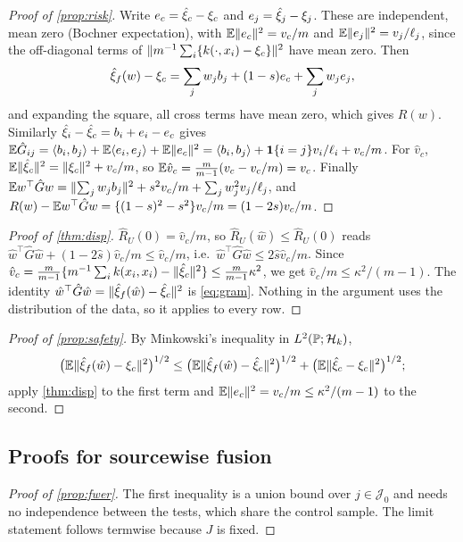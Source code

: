 \documentclass[11pt,a4paper]{article}
\begin{document}
\begin{proof}[Proof of \cref{prop:risk}]
Write $e_c=\hat\xi_c-\xi_c$ and $e_j=\hat\xi_j-\xi_j$. These are independent, mean zero (Bochner expectation), with $\mathbb{E}\lVert e_c\rVert^2=v_c/m$ and $\mathbb{E}\lVert e_j\rVert^2=v_j/\ell_j$, since the off-diagonal terms of $\lVert m^{-1}\sum_i\{k(\cdot,x_i)-\xi_c\}\rVert^2$ have mean zero. Then
\[
\hat\xi_f(w)-\xi_c=\sum_jw_jb_j+(1-s)e_c+\sum_jw_je_j,
\]
and expanding the square, all cross terms have mean zero, which gives $R(w)$. Similarly $\hat\xi_i-\hat\xi_c=b_i+e_i-e_c$ gives $\mathbb{E}\hat G_{ij}=\langle b_i, b_j\rangle+\mathbb{E}\langle e_i, e_j\rangle+\mathbb{E}\lVert e_c\rVert^2=\langle b_i, b_j\rangle+\mathbf{1}\{i=j\}v_i/\ell_i+v_c/m$. For $\hat v_c$, $\mathbb{E}\lVert \hat\xi_c\rVert^2=\lVert \xi_c\rVert^2+v_c/m$, so $\mathbb{E}\hat v_c=\frac{m}{m-1}(v_c-v_c/m)=v_c$. Finally $\mathbb{E} w^\top\hat Gw=\lVert \sum_jw_jb_j\rVert^2+s^2v_c/m+\sum_jw_j^2v_j/\ell_j$, and $R(w)-\mathbb{E} w^\top\hat Gw=\{(1-s)^2-s^2\}v_c/m=(1-2s)v_c/m$.
\end{proof}

\begin{proof}[Proof of \cref{thm:disp}]
$\hat R_U(0)=\hat v_c/m$, so $\hat R_U(\hat w)\le\hat R_U(0)$ reads $\hat w^\top\hat G\hat w+(1-2\hat s)\hat v_c/m\le\hat v_c/m$, i.e.\ $\hat w^\top\hat G\hat w\le2\hat s\hat v_c/m$. Since $\hat v_c=\frac{m}{m-1}\{m^{-1}\sum_ik(x_i,x_i)-\lVert \hat\xi_c\rVert^2\}\le\frac{m}{m-1}\kappa^2$, we get $\hat v_c/m\le\kappa^2/(m-1)$. The identity $\hat w^\top\hat G\hat w=\lVert \hat\xi_f(\hat w)-\hat\xi_c\rVert^2$ is \eqref{eq:gram}. Nothing in the argument uses the distribution of the data, so it applies to every row.
\end{proof}

\begin{proof}[Proof of \cref{prop:safety}]
By Minkowski's inequality in $L^2(\mathbb{P};\mathcal{H}_k)$,
\[
\big(\mathbb{E}\lVert \hat\xi_f(\hat w)-\xi_c\rVert^2\big)^{1/2}\le\big(\mathbb{E}\lVert \hat\xi_f(\hat w)-\hat\xi_c\rVert^2\big)^{1/2}+\big(\mathbb{E}\lVert \hat\xi_c-\xi_c\rVert^2\big)^{1/2};
\]
apply \cref{thm:disp} to the first term and $\mathbb{E}\lVert e_c\rVert^2=v_c/m\le\kappa^2/(m-1)$ to the second.
\end{proof}

\subsection{Proofs for sourcewise fusion}

\begin{proof}[Proof of \cref{prop:fwer}]
The first inequality is a union bound over $j\in\mathcal J_0$ and needs no independence between the tests, which share the control sample. The limit statement follows termwise because $J$ is fixed.
\end{proof}
\end{document}
